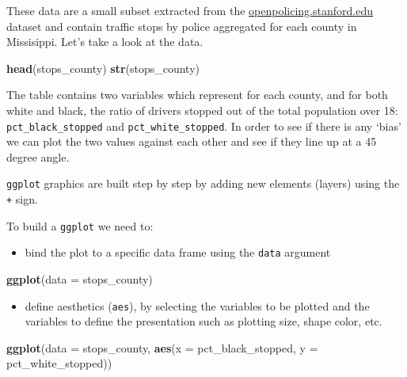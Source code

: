 \documentclass[]{book}
\newenvironment{Shaded}{\begin{snugshade}}{\end{snugshade}}
\newcommand{\KeywordTok}[1]{\textcolor[rgb]{0.13,0.29,0.53}{\textbf{#1}}}
\newcommand{\DataTypeTok}[1]{\textcolor[rgb]{0.13,0.29,0.53}{#1}}
\newcommand{\NormalTok}[1]{#1}
\providecommand{\tightlist}{%
  \setlength{\itemsep}{0pt}\setlength{\parskip}{0pt}}
\theoremstyle{definition}
\theoremstyle{definition}
\theoremstyle{definition}
\theoremstyle{remark}
\begin{document}
These data are a small subset extracted from the
\href{https://openpolicing.stanford.edu}{openpolicing.stanford.edu}
dataset and contain traffic stops by police aggregated for each county
in Missisippi. Let's take a look at the data.

\begin{Shaded}
\begin{Highlighting}[]
\KeywordTok{head}\NormalTok{(stops_county)}
\KeywordTok{str}\NormalTok{(stops_county)}
\end{Highlighting}
\end{Shaded}

The table contains two variables which represent for each county, and
for both white and black, the ratio of drivers stopped out of the total
population over 18: \texttt{pct\_black\_stopped} and
\texttt{pct\_white\_stopped}. In order to see if there is any `bias' we
can plot the two values against each other and see if they line up at a
45 degree angle.

\texttt{ggplot} graphics are built step by step by adding new elements
(layers) using the \texttt{+} sign.

To build a \texttt{ggplot} we need to:

\begin{itemize}
\tightlist
\item
  bind the plot to a specific data frame using the \texttt{data}
  argument
\end{itemize}

\begin{Shaded}
\begin{Highlighting}[]
\KeywordTok{ggplot}\NormalTok{(}\DataTypeTok{data =}\NormalTok{ stops_county)}
\end{Highlighting}
\end{Shaded}

\begin{itemize}
\tightlist
\item
  define aesthetics (\texttt{aes}), by selecting the variables to be
  plotted and the variables to define the presentation such as plotting
  size, shape color, etc.
\end{itemize}

\begin{Shaded}
\begin{Highlighting}[]
\KeywordTok{ggplot}\NormalTok{(}\DataTypeTok{data =}\NormalTok{ stops_county, }\KeywordTok{aes}\NormalTok{(}\DataTypeTok{x =}\NormalTok{ pct_black_stopped, }\DataTypeTok{y =}\NormalTok{ pct_white_stopped))}
\end{Highlighting}
\end{Shaded}
\end{document}

